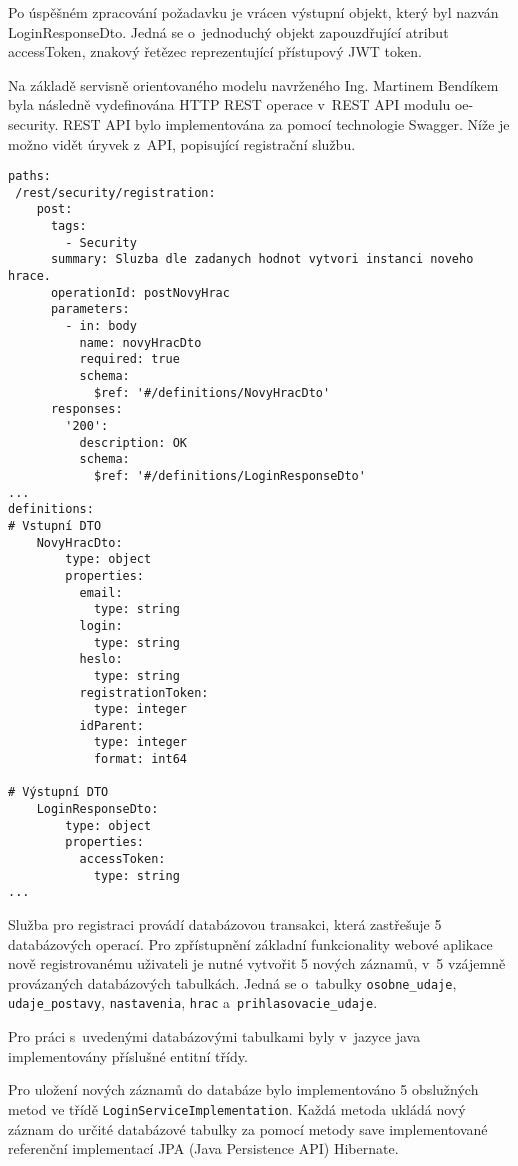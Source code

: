 \documentclass[12pt]{article}
\begin{document}
{Po úspěšném zpracování požadavku je vrácen výstupní objekt, 
který byl nazván LoginResponseDto.
Jedná se o~jednoduchý objekt zapouzdřující atribut accessToken, znakový řetězec reprezentující přístupový JWT token. 

Na základě servisně orientovaného modelu navrženého Ing. Martinem Bendíkem byla
následně vydefinována HTTP REST operace v~REST API modulu oe-security. 
REST API bylo implementována za pomocí technologie Swagger. Níže je možno vidět úryvek z~API, popisující registrační službu. 

\clearpage

\begin{lstlisting}
paths:
 /rest/security/registration:
    post:
      tags:
        - Security
      summary: Sluzba dle zadanych hodnot vytvori instanci noveho hrace.
      operationId: postNovyHrac
      parameters:
        - in: body
          name: novyHracDto
          required: true
          schema:
            $ref: '#/definitions/NovyHracDto'
      responses:
        '200':
          description: OK
          schema:
            $ref: '#/definitions/LoginResponseDto'
...
definitions:
# Vstupní DTO
    NovyHracDto:
        type: object
        properties:
          email:
            type: string
          login:
            type: string
          heslo:
            type: string
          registrationToken:
            type: integer
          idParent:
            type: integer
            format: int64
        
# Výstupní DTO 
    LoginResponseDto:
        type: object
        properties:
          accessToken:
            type: string
...
\end{lstlisting}

Služba pro registraci provádí databázovou transakci,
která zastřešuje 5 databázových operací. 
Pro zpřístupnění základní funkcionality webové aplikace nově registrovanému uživateli je nutné vytvořit 5 nových záznamů,
v~5 vzájemně provázaných databázových tabulkách.
Jedná se o~tabulky \texttt{osobne\_udaje}, \texttt{udaje\_postavy}, \texttt{nastavenia}, \texttt{hrac} a~\texttt{prihlasovacie\_udaje}.

Pro práci s~uvedenými databázovými tabulkami byly v~jazyce java implementovány příslušné entitní třídy.

\obrazek
{}

\clearpage

Pro uložení nových záznamů do databáze bylo implementováno 5 obslužných metod ve třídě \texttt{LoginServiceImplementation}. Každá metoda ukládá nový záznam do určité databázové tabulky za pomocí metody save implementované referenční implementací JPA (Java Persistence API) Hibernate. 

}
\end{document}
